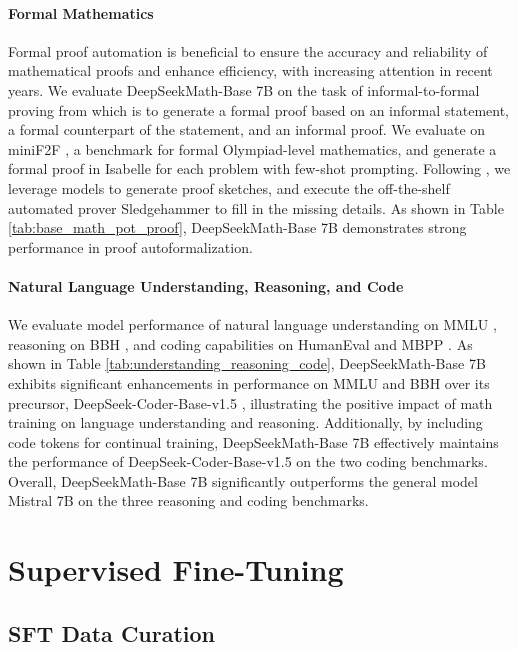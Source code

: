 \paragraph{Formal Mathematics}

Formal proof automation is beneficial to ensure the accuracy and reliability of mathematical proofs and enhance efficiency, with increasing attention in recent years. We evaluate DeepSeekMath-Base 7B on the task of informal-to-formal proving from \citep{dsp_proof} which is to generate a formal proof based on an informal statement, a formal counterpart of the statement, and an informal proof. We evaluate on miniF2F \citep{minif2f}, a benchmark for formal Olympiad-level mathematics, and generate a formal proof in Isabelle for each problem with few-shot prompting. Following \cite{dsp_proof}, we leverage models to generate proof sketches, and execute the off-the-shelf automated prover Sledgehammer \citep{sledgehammer} to fill in the missing details. As shown in Table \ref{tab:base_math_pot_proof}, DeepSeekMath-Base 7B demonstrates strong performance in proof autoformalization.

\paragraph{Natural Language Understanding, Reasoning, and Code}

We evaluate model performance of natural language understanding on MMLU \citep{mmlu}, reasoning on BBH \citep{bbh}, and coding capabilities on HumanEval \citep{codex} and MBPP \citep{mbpp}. As shown in Table \ref{tab:understanding_reasoning_code}, DeepSeekMath-Base 7B exhibits significant enhancements in performance on MMLU and BBH over its precursor, DeepSeek-Coder-Base-v1.5 \citep{deepseek-coder}, illustrating the positive impact of math training on language understanding and reasoning. Additionally, by including code tokens for continual training, DeepSeekMath-Base 7B effectively maintains the performance of DeepSeek-Coder-Base-v1.5 on the two coding benchmarks. Overall, DeepSeekMath-Base 7B significantly outperforms the general model Mistral 7B \citep{mistral} on the three reasoning and coding benchmarks.

\section{Supervised Fine-Tuning}

\subsection{SFT Data Curation}

